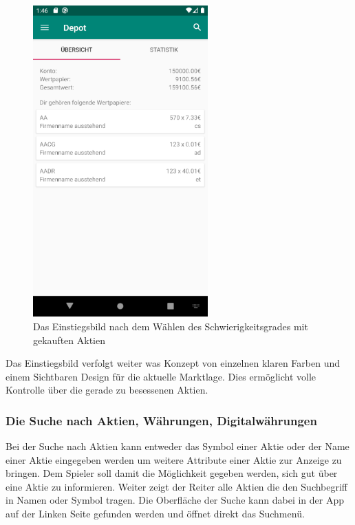 \documentclass[10pt]{scrartcl}
\begin{document}
\begin{figure}[H]
	\centering
	\includegraphics[width=0.6\textwidth]{Bilder/Prsi/einstieg.png}
	\caption{Das Einstiegsbild nach dem Wählen des Schwierigkeitsgrades mit gekauften Aktien}
\end{figure}

Das Einstiegsbild verfolgt weiter was Konzept von einzelnen klaren Farben und einem Sichtbaren Design für die aktuelle Marktlage. Dies ermöglicht volle Kontrolle über die gerade zu besessenen Aktien.
								
\subsubsection{Die Suche nach Aktien, Währungen, Digitalwährungen}

Bei der Suche nach Aktien kann entweder das Symbol einer Aktie oder der Name einer Aktie eingegeben werden um weitere Attribute einer Aktie zur Anzeige zu bringen. Dem Spieler soll damit die Möglichkeit gegeben werden, sich gut über eine Aktie zu informieren. Weiter zeigt der Reiter alle Aktien die den Suchbegriff in Namen oder Symbol tragen. Die Oberfläche der Suche kann dabei in der App auf der Linken Seite gefunden werden und öffnet direkt das Suchmenü.
\end{document}
